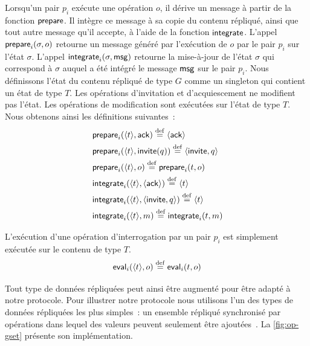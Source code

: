 Lorsqu'un pair $p_i$ exécute une opération $o$, il dérive un message à partir de la fonction $\operatorname{\mathsf{prepare}}$.
Il intègre ce message à sa copie du contenu répliqué, ainsi que tout autre message qu'il accepte, à l'aide de la fonction $\operatorname{\mathsf{integrate}}$.
L'appel $\operatorname{\mathsf{prepare}}_i(\sigma, o)$ retourne un message généré par l'exécution de $o$ par le pair $p_i$ sur l'état $\sigma$.
L'appel $\operatorname{\mathsf{integrate}}_i(\sigma, \operatorname{\mathsf{msg}})$ retourne la mise-à-jour de l'état $\sigma$ qui correspond à $\sigma$ auquel a été intégré le message $\operatorname{\mathsf{msg}}$ sur le pair $p_i$.
Nous définissons l'état du contenu répliqué de type $G$ comme un singleton qui contient un état de type $T$.
Les opérations d'invitation et d'acquiescement ne modifient pas l'état.
Les opérations de modification sont exécutées sur l'état de type $T$.
Nous obtenons ainsi les définitions suivantes~:
%
\begin{align}
    &\trm{prepare}_i(\tuple*{t}, \trm{ack}) \defeq \tuple*{\trm{ack}}\\
    &\trm{prepare}_i(\tuple*{t}, \trm{invite}(q)) \defeq \tuple*{\trm{invite}, q}\\
    &\trm{prepare}_i(\tuple*{t}, o) \defeq \trm{prepare}_i(t, o)\\
    &\trm{integrate}_i(\tuple*{t}, \tuple*{\trm{ack}}) \defeq \tuple*{t}\\
    &\trm{integrate}_i(\tuple*{t}, \tuple*{\trm{invite}, q}) \defeq \tuple*{t}\\
    &\trm{integrate}_i(\tuple*{t}, m) \defeq \trm{integrate}_i(t, m)
\end{align}

L'exécution d'une opération d'interrogation par un pair $p_i$ est simplement exécutée sur le contenu de type $T$.
%
\begin{equation}
    \trm{eval}_i(\tuple*{t}, o) \defeq \trm{eval}_i(t, o)
\end{equation}

Tout type de données répliquées peut ainsi être augmenté pour être adapté à notre protocole.
Pour illustrer notre protocole nous utilisons l'un des types de données répliquées les plus simples~: un ensemble répliqué synchronisé par opérations dans lequel des valeurs peuvent seulement être ajoutées~\autocite{baquero_2018_pure-op-crdt}.
La \autoref{fig:op-gset} présente son implémentation.

